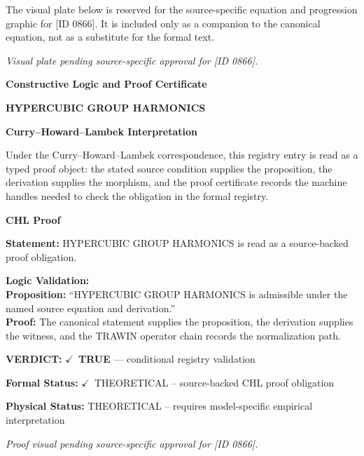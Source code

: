 \begingroup\footnotesize\sloppy
The visual plate below is reserved for the source-specific equation and progression graphic for [ID 0866]. It is included only as a companion to the canonical equation, not as a substitute for the formal text.
\par\endgroup
\begingroup\footnotesize\itshape
Visual plate pending source-specific approval for [ID 0866].
\par\endgroup

\clearpage
\begingroup\tzpsupportsetup
\noindent\textbf{\fontsize{10.8pt}{12.8pt}\selectfont [ID 0866] Constructive Logic and Proof Certificate}\par
\noindent\textbf{\fontsize{10pt}{12pt}\selectfont HYPERCUBIC GROUP HARMONICS}\par
\vspace{0.45em}
\begingroup
\footnotesize
\setlength{\parskip}{0.22em}
\setlength{\parindent}{0pt}
\noindent\textbf{Curry--Howard--Lambek Interpretation}\par
Under the Curry--Howard--Lambek correspondence, this registry entry is read as a typed proof
object: the stated source condition supplies the proposition, the derivation supplies the
morphism, and the proof certificate records the machine handles needed to check the obligation
in the formal registry.

\vspace{0.45em}
\noindent\textbf{CHL Proof}\par
\textbf{Statement:} HYPERCUBIC GROUP HARMONICS is read as a source-backed proof obligation.

\textbf{Logic Validation:}\\
\textbf{Proposition:} ``HYPERCUBIC GROUP HARMONICS is admissible under the named source equation and derivation.''\\
\textbf{Proof:} The canonical statement supplies the proposition, the derivation supplies the witness, and the TRAWIN operator chain records the normalization path.

\textbf{VERDICT:} \ensuremath{\checkmark}\ \textbf{TRUE} --- conditional registry validation

\textbf{Formal Status:} \ensuremath{\checkmark}\ THEORETICAL -- source-backed CHL proof obligation

\textbf{Physical Status:} THEORETICAL -- requires model-specific empirical interpretation
\par\vspace{0.45em}
\par
\vfill
\begingroup\footnotesize\itshape
Proof visual pending source-specific approval for [ID 0866].
\par\endgroup
\vfill
\endgroup
\endgroup
